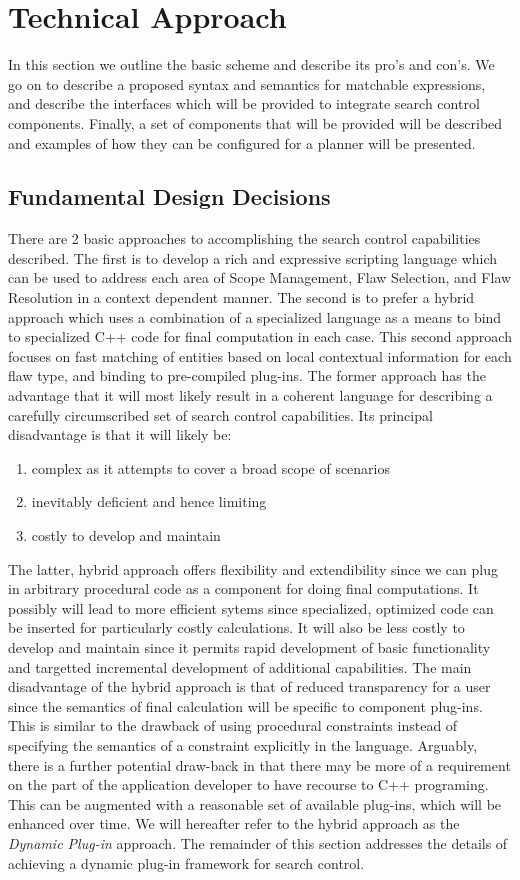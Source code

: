 \documentclass[10pt, letterpaper, twoside]{article}
\begin{document}
\section{Technical Approach}
In this section we outline the basic scheme and describe its pro's and con's. We go on to describe a proposed syntax and semantics for matchable expressions, and describe the interfaces which will be provided to integrate search control components. Finally, a set of components that will be provided will be described and examples of how they can be configured for a planner will be presented.

\subsection{Fundamental Design Decisions}
There are 2 basic approaches to accomplishing the search control capabilities described. The first is to develop a rich and expressive scripting language which can be used to address each area of Scope Management, Flaw Selection, and Flaw Resolution in a context dependent manner. The second is to prefer a hybrid approach which uses a combination of a specialized language as a means to bind to specialized C++ code for final computation in each case. This second approach focuses on fast matching of entities based on local contextual information for each flaw type, and binding to pre-compiled plug-ins. The former approach has the advantage that it will most likely result in a coherent language for describing a carefully circumscribed set of search control capabilities. Its principal disadvantage is that it will likely be:
\begin{enumerate}
\item complex as it attempts to cover a broad scope of scenarios
\item inevitably deficient and hence limiting
\item costly to develop and maintain
\end{enumerate}

The latter, hybrid approach offers flexibility and extendibility since we can plug in arbitrary procedural code as a component for doing final computations. It possibly will lead to more efficient sytems since specialized, optimized code can be inserted for particularly costly calculations. It will also be less costly to develop and maintain since it permits rapid development of basic functionality and targetted incremental development of additional capabilities. The main disadvantage of the hybrid approach is that of reduced transparency for a user since the semantics of final calculation will be specific to component plug-ins. This is similar to the drawback of using procedural constraints instead of specifying the semantics of a constraint explicitly in the language. Arguably, there is a further potential draw-back in that there may be more of a requirement on the part of the application developer to have recourse to C++ programing. This can be augmented with a reasonable set of available plug-ins, which will be enhanced over time. We will hereafter refer to the hybrid approach as the {\em Dynamic Plug-in} approach. The remainder of this section addresses the details of achieving a dynamic plug-in framework for search control.
\end{document}
